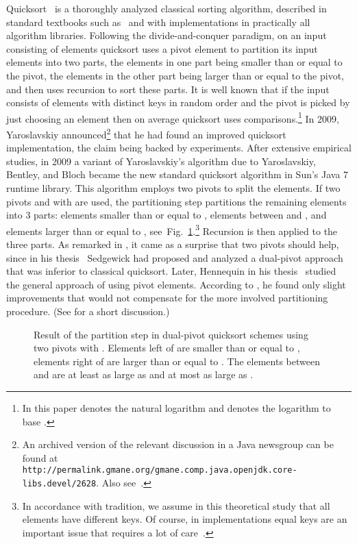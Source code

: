 \documentclass[prodmode,acmtalg]{acmsmall}
\begin{document}
Quicksort~\cite{Hoare} is a thoroughly analyzed classical sorting algorithm,
described in standard textbooks such as~\cite{CLRS,Knuth,FlajSedg} 
and with implementations in practically all algorithm libraries. 
Following the divide-and-conquer paradigm, on an input consisting of  elements
quicksort uses a pivot element to 
partition its input elements into two parts, 
the elements in one part being smaller than or equal to the pivot, the elements in the other 
part being larger than or equal to the pivot, and then uses recursion to sort these parts. 
It is well known that if the input consists of
 elements with distinct keys in random order and the pivot is picked by just
choosing an element then on average quicksort uses  comparisons.\footnote{
In this paper  denotes the natural logarithm and  denotes the logarithm to base .}
In 2009, Yaroslavskiy announced\footnote{An archived version of the relevant discussion in a Java newsgroup can be found at\\
    \texttt{http://permalink.gmane.org/gmane.comp.java.openjdk.core-libs.devel/2628}. Also see~\cite{nebel12}.} 
that he had found an improved quicksort implementation, the claim being backed by experiments. 
After extensive empirical studies, in 2009 a variant of Yaroslavskiy's
algorithm due to Yaroslavskiy, Bentley, and Bloch became the new standard quicksort algorithm in Sun's Java 7 runtime library. 
This algorithm employs two pivots to split the elements.
If two pivots  and  with  are used, 
the partitioning step partitions the remaining  elements into 3 parts:
elements smaller than or equal to , 
elements between  and , and elements larger than or equal to ,
see~Fig.~\ref{fig:dual:pivot:partition}.\footnote{In accordance with tradition, we assume in this theoretical study that all elements have different keys. 
Of course, in implementations equal keys are an important issue that requires a lot of care~\cite{SedgewickEqual}.}
Recursion is then applied to the three parts.
As remarked in \cite{nebel12}, it came as a surprise that two pivots should help, since in his thesis~\cite{sedgewick}
Sedgewick had proposed and analyzed  a dual-pivot
approach that was inferior to classical quicksort. Later, Hennequin in his
thesis~\cite{hennequin}
studied the general approach of using  pivot elements. According to \cite{nebel12}, he found only
slight improvements that would not compensate for the more involved partitioning procedure. 
(See \cite{nebel12} for a short discussion.)

\begin{figure}[tb]
    \centering
    \caption{Result of the partition step in dual-pivot quicksort schemes using
    two pivots  with . Elements left of  are smaller than or equal to , 
    elements right of  are larger than or equal to . The elements between  and 
    are at least as large as  and at most as large as .}
    \label{fig:dual:pivot:partition}
\end{figure}
\end{document}
